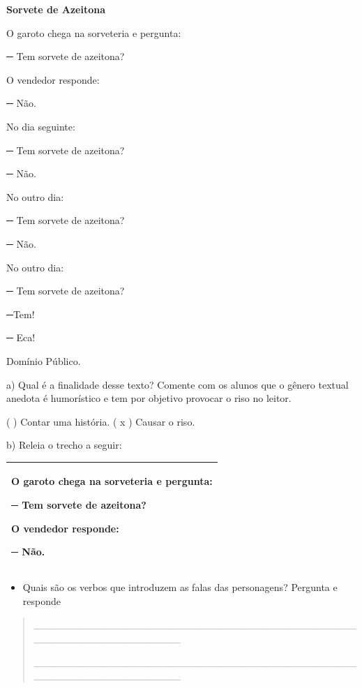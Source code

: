 \textbf{Sorvete de Azeitona}

O garoto chega na sorveteria e pergunta:

─ Tem sorvete de azeitona?

O vendedor responde:

─ Não.

No dia seguinte:

─ Tem sorvete de azeitona?

─ Não.

No outro dia:

─ Tem sorvete de azeitona?

─ Não.

No outro dia:

─ Tem sorvete de azeitona?

─Tem!

─ Eca!

Domínio Público.

a) Qual é a finalidade desse texto? Comente com os alunos que o gênero
textual anedota é humorístico e tem por objetivo provocar o riso no
leitor.

( ) Contar uma história. ( x ) Causar o riso.

b) Releia o trecho a seguir:

\begin{longtable}[]{@{}l@{}}
\toprule
\begin{minipage}[t]{0.97\columnwidth}\raggedright\strut
O garoto chega na sorveteria e pergunta:

─ Tem sorvete de azeitona?

O vendedor responde:

─ Não.\strut
\end{minipage}\tabularnewline
\bottomrule
\end{longtable}

\begin{itemize}
\item
  Quais são os verbos que introduzem as falas das personagens? Pergunta
  e responde
\end{itemize}

\begin{quote}
\_\_\_\_\_\_\_\_\_\_\_\_\_\_\_\_\_\_\_\_\_\_\_\_\_\_\_\_\_\_\_\_\_\_\_\_\_\_\_\_\_\_\_\_\_\_\_\_\_\_\_\_\_\_\_\_\_\_\_\_\_\_\_\_

\_\_\_\_\_\_\_\_\_\_\_\_\_\_\_\_\_\_\_\_\_\_\_\_\_\_\_\_\_\_\_\_\_\_\_\_\_\_\_\_\_\_\_\_\_\_\_\_\_\_\_\_\_\_\_\_\_\_\_\_\_\_\_\_
\end{quote}

